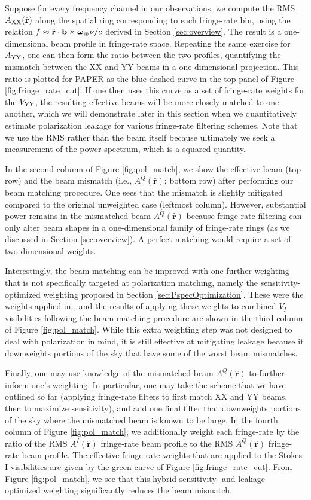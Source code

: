 \documentclass[twocolumn,apj,numberedappendix]{emulateapj}
\newcommand{\rhat}{\hat{\mathbf{r}}}
\begin{document}
Suppose for every frequency channel in our observations, we compute the RMS $A_{\rm XX} (\rhat)$ along
the spatial ring corresponding to each fringe-rate bin, using the relation $f \approx \rhat \cdot \mathbf{b}
\times \boldsymbol \omega_\Earth \nu / c$ derived in Section \ref{sec:overview}. The result is
a one-dimensional beam profile in fringe-rate space. Repeating the same exercise for $A_{\rm YY}$,
one can then form the ratio between the two profiles, quantifying the mismatch between the XX and YY
beams in a one-dimensional projection. This ratio is plotted for PAPER as the blue dashed curve in the
top panel of Figure \ref{fig:fringe_rate_cut}. If one then uses this curve as a set of fringe-rate weights
for the ${V_{\rm YY}}$, the resulting effective beams will be more closely matched to one another, which we
will demonstrate later in this section when we quantitatively estimate polarization leakage for various fringe-rate filtering
schemes. Note that
we use the RMS rather than the beam itself because ultimately we seek a measurement
of the power spectrum, which is a squared quantity.

In the second column of Figure \ref{fig:pol_match}, we show the effective beam (top row) and the beam
mismatch (i.e., $A^Q (\rhat)$; bottom row) after performing our beam matching procedure. One sees
that the mismatch is slightly mitigated compared to the original unweighted case (leftmost column).
However, substantial power remains in the mismatched beam $A^Q (\rhat)$ because fringe-rate
filtering can only alter beam shapes in a one-dimensional family of fringe-rate rings (as we discussed in
Section \ref{sec:overview}). A perfect matching would require a set of two-dimensional weights.

Interestingly, the beam matching can be improved with one further weighting that 
is not specifically targeted at polarization matching, namely the sensitivity-optimized weighting
proposed in Section \ref{sec:PspecOptimization}. These were the weights applied in \citet{ali_et_al2015},
and the results of applying these weights to combined $V_I$ visibilities following the beam-matching procedure are shown
in the third column of Figure \ref{fig:pol_match}. While this extra weighting step was not designed
to deal with polarization in mind, it is still effective at mitigating leakage because it
downweights portions of the sky that have some of the worst beam mismatches.

Finally, one may use knowledge of the mismatched beam $A^Q (\rhat)$ to further inform one's weighting.
In particular, one may take the scheme that we have outlined so far (applying fringe-rate filters to first match XX and YY beams, then to maximize sensitivity), and add one final filter that downweights
portions of the sky where the mismatched beam is known to be large. In the fourth column of
Figure \ref{fig:pol_match}, we additionally weight each fringe-rate by the ratio of the RMS $A^I (\rhat)$ fringe-rate beam profile to the RMS $A^Q (\rhat)$ fringe-rate beam profile. The effective fringe-rate
weights that are applied to the Stokes I visibilities are given by the green curve of Figure \ref{fig:fringe_rate_cut}. From Figure \ref{fig:pol_match}, we see that this hybrid sensitivity- and leakage-
optimized weighting significantly reduces the beam mismatch.
\end{document}
